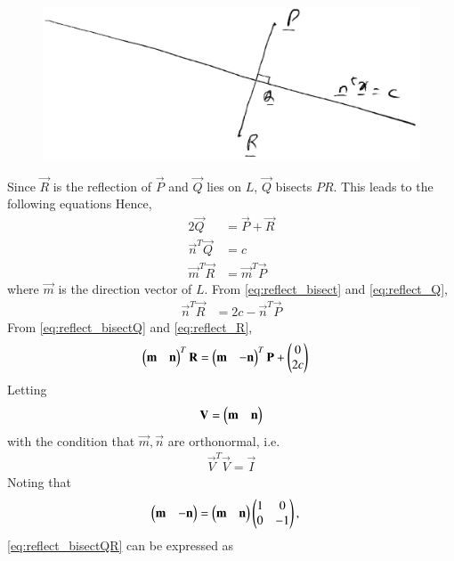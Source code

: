 \begin{enumerate}[label=\arabic*.,ref=\thesubsection.\theenumi]
%
\begin{figure}
\centering
\includegraphics[width=\columnwidth]{./figs/reflection.eps}
\caption{}
\label{fig:locus}
\end{figure}
\solution Since $\vec{R}$ is the reflection of $\vec{P}$ and $\vec{Q}$ lies on $L$, $\vec{Q}$ bisects $PR$.  
This leads to the following equations
Hence, 
\begin{align}
\label{eq:reflect_bisect}
2\vec{Q} &= \vec{P}+\vec{R}
\\
\label{eq:reflect_Q}
\vec{n}^{T}\vec{Q} &= c
\\
\label{eq:reflect_R}
\vec{m}^{T}\vec{R} &= \vec{m}^{T}\vec{P}
\end{align}
%
where $\vec{m}$ is the direction vector of $L$.  From \eqref{eq:reflect_bisect} and \eqref{eq:reflect_Q},
\begin{align}
\label{eq:reflect_bisectQ}
\vec{n}^{T}\vec{R}  &= 2c - \vec{n}^{T}\vec{P}
\end{align}
%
From \eqref{eq:reflect_bisectQ} and \eqref{eq:reflect_R},
\begin{align}
\label{eq:reflect_bisectQR}
\begin{pmatrix}\mathbf{m} & \mathbf{n}\end{pmatrix}^T\mathbf{R} &= \begin{pmatrix}\mathbf{m} & -\mathbf{n}\end{pmatrix}^T\mathbf{P}+ \begin{pmatrix}0 \\ 2c\end{pmatrix}
\end{align}
%
Letting 
\begin{align}
\label{eq:reflect_mat}
\mathbf{V}=  \begin{pmatrix}\mathbf{m} & \mathbf{n}\end{pmatrix}
\end{align}
with the condition that $\vec{m},\vec{n}$ are orthonormal, i.e.
\begin{align}
\label{eq:reflect_ortho}
\vec{V}^T\vec{V}=  \vec{I}
\end{align}
%
Noting that 
\begin{align}
\label{eq:reflect_trans}
\begin{pmatrix}\mathbf{m} & -\mathbf{n}\end{pmatrix} &= \begin{pmatrix}\mathbf{m} & \mathbf{n}\end{pmatrix} \begin{pmatrix}1 & 0 \\ 0 & -1\end{pmatrix},
\end{align}
\eqref{eq:reflect_bisectQR} can be expressed as
%
\begin{align}

\end{align}
\end{enumerate}
